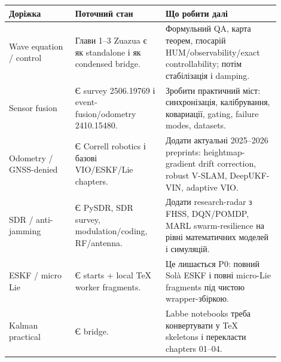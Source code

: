 \begin{longtable}{L{0.22\linewidth}L{0.30\linewidth}L{0.38\linewidth}}
\toprule
Доріжка & Поточний стан & Що робити далі \\
\midrule
Wave equation / control & Глави 1--3 Zuazua є як standalone і як condensed bridge. & Формульний QA, карта теорем, глосарій HUM/observability/exact controllability; потім стабілізація і damping. \\
Sensor fusion & Є survey 2506.19769 і event-fusion/odometry 2410.15480. & Зробити практичний міст: синхронізація, калібрування, ковариації, gating, failure modes, datasets. \\
Odometry / GNSS-denied & Є Correll robotics і базові VIO/ESKF/Lie chapters. & Додати актуальні 2025--2026 preprints: heightmap-gradient drift correction, robust V-SLAM, DeepUKF-VIN, adaptive VIO. \\
SDR / anti-jamming & Є PySDR, SDR survey, modulation/coding, RF/antenna. & Додати research-radar з FHSS, DQN/POMDP, MARL swarm-resilience на рівні математичних моделей і симуляцій. \\
ESKF / micro Lie & Є starts + local TeX worker fragments. & Це лишається P0: повний Solà ESKF і повні micro-Lie fragments під чистою wrapper-збіркою. \\
Kalman practical & Є bridge. & Labbe notebooks треба конвертувати у TeX skeletons і перекласти chapters 01--04. \\
\bottomrule
\end{longtable}
